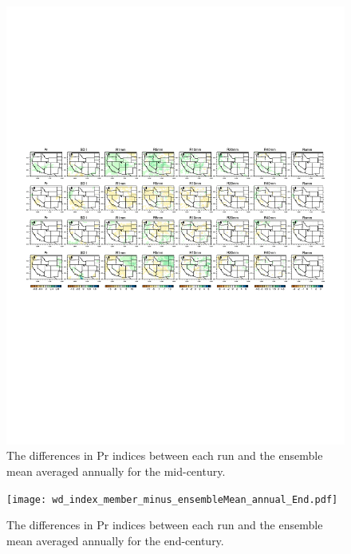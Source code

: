 \documentclass{ametsoc}
\begin{document}
\begin{figure}
\begin{center}
\includegraphics[width=6in]{wd_index_member_minus_ensembleMean_annual_Mid.pdf}
\caption{The differences in Pr indices between each run and the ensemble mean averaged annually for the mid-century.}
\label{fig:S2}
\end{center}
\end{figure}

\begin{figure}
\begin{center}
\texttt{[image: wd\_index\_member\_minus\_ensembleMean\_annual\_End.pdf]}
\caption{The differences in Pr indices between each run and the ensemble mean averaged annually for the end-century.}
\label{fig:S3}
\end{center}
\end{figure}


\end{document}
